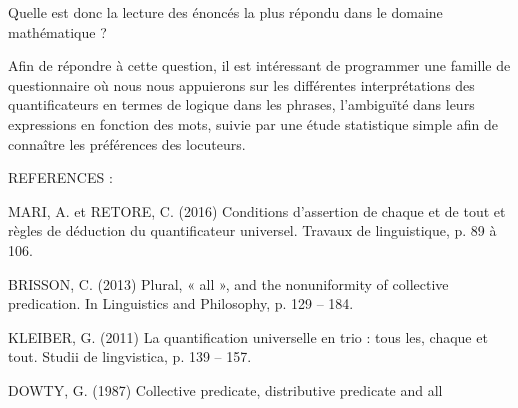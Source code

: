 \documentclass[11pt,letterpaper]{article}
\begin{document}
\par Quelle est donc la lecture des énoncés la plus répondu dans le domaine mathématique ?
\vspace{5mm}
\par Afin de répondre à cette question, il est intéressant de programmer une famille de questionnaire où nous nous appuierons sur les différentes interprétations des quantificateurs en termes de logique dans les phrases, l’ambiguïté dans leurs expressions en fonction des mots, suivie par une étude statistique simple afin de connaître les
préférences des locuteurs.






\vspace{5mm}
\par REFERENCES : \par
MARI, A. et RETORE, C. (2016) Conditions d’assertion de chaque et de tout et règles de
déduction du quantificateur universel. Travaux de linguistique, p. 89 à 106.
\par
BRISSON, C. (2013) Plural, « all », and the nonuniformity of collective predication. In
Linguistics and Philosophy, p. 129 – 184.
\par
KLEIBER, G. (2011) La quantification universelle en trio : tous les, chaque et tout. Studii de
lingvistica, p. 139 – 157.

\par DOWTY, G. (1987) Collective predicate, distributive predicate and all 
\end{document}
